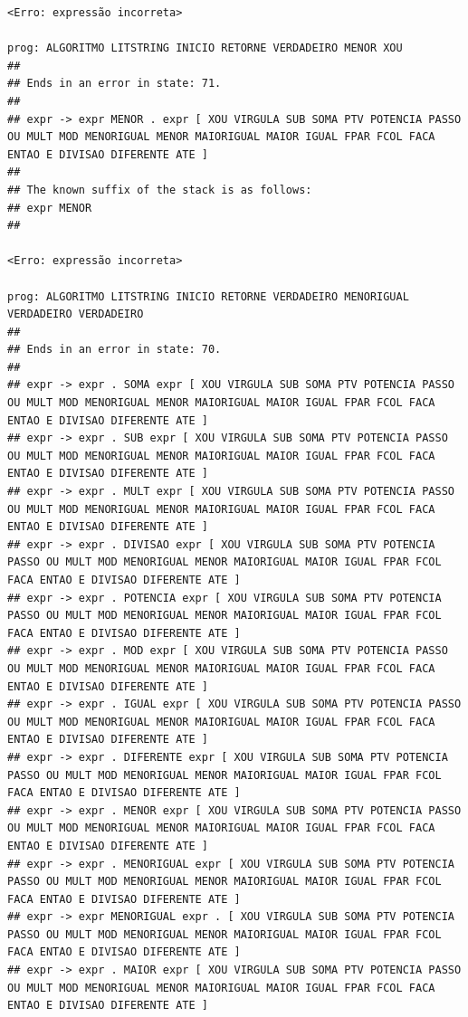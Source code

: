 \documentclass[hidelinks,12pt]{article}
\begin{document}
\begin{lstlisting}
<Erro: expressão incorreta>

prog: ALGORITMO LITSTRING INICIO RETORNE VERDADEIRO MENOR XOU 
##
## Ends in an error in state: 71.
##
## expr -> expr MENOR . expr [ XOU VIRGULA SUB SOMA PTV POTENCIA PASSO OU MULT MOD MENORIGUAL MENOR MAIORIGUAL MAIOR IGUAL FPAR FCOL FACA ENTAO E DIVISAO DIFERENTE ATE ]
##
## The known suffix of the stack is as follows:
## expr MENOR 
##

<Erro: expressão incorreta>

prog: ALGORITMO LITSTRING INICIO RETORNE VERDADEIRO MENORIGUAL VERDADEIRO VERDADEIRO 
##
## Ends in an error in state: 70.
##
## expr -> expr . SOMA expr [ XOU VIRGULA SUB SOMA PTV POTENCIA PASSO OU MULT MOD MENORIGUAL MENOR MAIORIGUAL MAIOR IGUAL FPAR FCOL FACA ENTAO E DIVISAO DIFERENTE ATE ]
## expr -> expr . SUB expr [ XOU VIRGULA SUB SOMA PTV POTENCIA PASSO OU MULT MOD MENORIGUAL MENOR MAIORIGUAL MAIOR IGUAL FPAR FCOL FACA ENTAO E DIVISAO DIFERENTE ATE ]
## expr -> expr . MULT expr [ XOU VIRGULA SUB SOMA PTV POTENCIA PASSO OU MULT MOD MENORIGUAL MENOR MAIORIGUAL MAIOR IGUAL FPAR FCOL FACA ENTAO E DIVISAO DIFERENTE ATE ]
## expr -> expr . DIVISAO expr [ XOU VIRGULA SUB SOMA PTV POTENCIA PASSO OU MULT MOD MENORIGUAL MENOR MAIORIGUAL MAIOR IGUAL FPAR FCOL FACA ENTAO E DIVISAO DIFERENTE ATE ]
## expr -> expr . POTENCIA expr [ XOU VIRGULA SUB SOMA PTV POTENCIA PASSO OU MULT MOD MENORIGUAL MENOR MAIORIGUAL MAIOR IGUAL FPAR FCOL FACA ENTAO E DIVISAO DIFERENTE ATE ]
## expr -> expr . MOD expr [ XOU VIRGULA SUB SOMA PTV POTENCIA PASSO OU MULT MOD MENORIGUAL MENOR MAIORIGUAL MAIOR IGUAL FPAR FCOL FACA ENTAO E DIVISAO DIFERENTE ATE ]
## expr -> expr . IGUAL expr [ XOU VIRGULA SUB SOMA PTV POTENCIA PASSO OU MULT MOD MENORIGUAL MENOR MAIORIGUAL MAIOR IGUAL FPAR FCOL FACA ENTAO E DIVISAO DIFERENTE ATE ]
## expr -> expr . DIFERENTE expr [ XOU VIRGULA SUB SOMA PTV POTENCIA PASSO OU MULT MOD MENORIGUAL MENOR MAIORIGUAL MAIOR IGUAL FPAR FCOL FACA ENTAO E DIVISAO DIFERENTE ATE ]
## expr -> expr . MENOR expr [ XOU VIRGULA SUB SOMA PTV POTENCIA PASSO OU MULT MOD MENORIGUAL MENOR MAIORIGUAL MAIOR IGUAL FPAR FCOL FACA ENTAO E DIVISAO DIFERENTE ATE ]
## expr -> expr . MENORIGUAL expr [ XOU VIRGULA SUB SOMA PTV POTENCIA PASSO OU MULT MOD MENORIGUAL MENOR MAIORIGUAL MAIOR IGUAL FPAR FCOL FACA ENTAO E DIVISAO DIFERENTE ATE ]
## expr -> expr MENORIGUAL expr . [ XOU VIRGULA SUB SOMA PTV POTENCIA PASSO OU MULT MOD MENORIGUAL MENOR MAIORIGUAL MAIOR IGUAL FPAR FCOL FACA ENTAO E DIVISAO DIFERENTE ATE ]
## expr -> expr . MAIOR expr [ XOU VIRGULA SUB SOMA PTV POTENCIA PASSO OU MULT MOD MENORIGUAL MENOR MAIORIGUAL MAIOR IGUAL FPAR FCOL FACA ENTAO E DIVISAO DIFERENTE ATE ]

\end{lstlisting}
\end{document}
